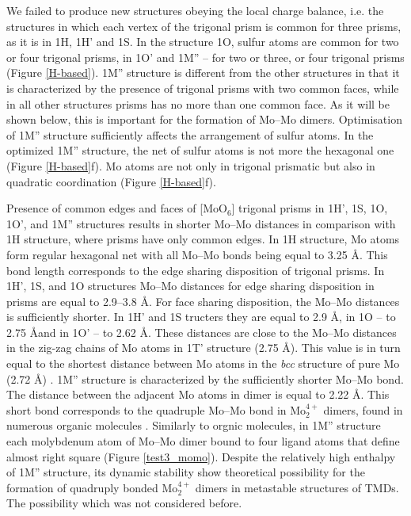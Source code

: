 \documentclass[a4paperm]{article}
\begin{document}
We failed to produce new structures obeying the local charge balance, i.e. the structures in which each vertex of the trigonal prism is common for three prisms, as it is in 1H, 1H' and 1S.
In the structure 1O, sulfur atoms are common for two or four trigonal prisms, in 1O' and 1M'' – for two or three, or four trigonal prisms (Figure \ref{H-based}).
1M'' structure is different from the other structures in that it is characterized by the presence of trigonal prisms with two common faces, while in all other structures prisms has no more than one common face.
As it will be shown below, this is important for the formation of Mo--Mo dimers.
Optimisation of 1M'' structure sufficiently affects the arrangement of sulfur atoms.
In the optimized 1M'' structure, the net of sulfur atoms is not more the hexagonal one (Figure \ref{H-based}f).
Mo atoms are not only in trigonal prismatic but also in quadratic coordination (Figure \ref{H-based}f).


Presence of common edges and faces of [MoO$_6$] trigonal prisms in 1H', 1S, 1O, 1O', and 1M'' structures results in shorter Mo--Mo distances in comparison with 1H structure, where prisms have only common edges.
In 1H structure, Mo atoms form regular hexagonal net with all Mo--Mo bonds being equal to 3.25 \AA.
This bond length corresponds to the edge sharing disposition of trigonal prisms.
In 1H', 1S, and 1O structures Mo--Mo distances for edge sharing disposition in prisms are equal to 2.9--3.8 \AA.
For face sharing disposition, the Mo--Mo distances is sufficiently shorter.
In 1H' and 1S tructers they are equal to 2.9 \AA, in 1O -- to 2.75 \AA and in 1O' -- to 2.62 \AA.
These distances are close to the Mo--Mo distances in the zig-zag chains of Mo atoms in 1T' structure (2.75 \AA).
This value is in turn equal to the shortest distance between Mo atoms in the {\it bcc} structure of pure Mo (2.72 \AA) \cite{MoV}.
1M'' structure is characterized by the sufficiently shorter Mo--Mo bond.
The distance between the adjacent Mo atoms in dimer is equal to 2.22 \AA.
This short bond corresponds to the quadruple Mo--Mo bond in Mo$_2^{4+}$ dimers, found in numerous organic molecules \cite{momo}.
Similarly to orgnic molecules, in 1M'' structure  each molybdenum atom of Mo--Mo dimer bound to four ligand atoms that define almost right square (Figure \ref{test3_momo}).
Despite the relatively high enthalpy of 1M'' structure, its dynamic stability show theoretical possibility for the formation of quadruply bonded Mo$_2^{4+}$ dimers in metastable structures of TMDs.
The possibility which was not considered before.
\end{document}
